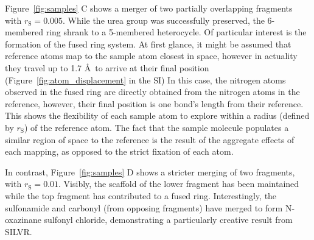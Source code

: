 \documentclass[journal=jacsat,manuscript=article]{achemso}
\begin{document}
Figure~\ref{fig:samples} C shows a merger of two partially overlapping fragments with $r_{\mathrm{S}}=0.005$. While the urea group was successfully preserved, the 6-membered ring shrank to a 5-membered heterocycle. Of particular interest is the formation of the fused ring system. At first glance, it might be assumed that reference atoms map to the sample atom closest in space, however in actuality they travel up to 1.7 \AA~to arrive at their final position (Figure~\ref{fig:atom_displacement} in the SI) In this case, the nitrogen atoms observed in the fused ring are directly obtained from the nitrogen atoms in the reference, however, their final position is one bond’s length from their reference. This shows the flexibility of each sample atom to explore within a radius (defined by $r_{\mathrm{S}}$) of the reference atom. The fact that the sample molecule populates a similar region of space to the reference is the result of the aggregate effects of each mapping, as opposed to the strict fixation of each atom. 

In contrast, Figure~\ref{fig:samples} D shows a stricter merging of two fragments, with $r_{\mathrm{S}}=0.01$. Visibly, the scaffold of the lower fragment has been maintained while the top fragment has contributed to a fused ring. Interestingly, the sulfonamide and carbonyl (from opposing fragments) have merged to form N-oxazinane sulfonyl chloride, demonstrating a particularly creative result from SILVR. 
\end{document}
